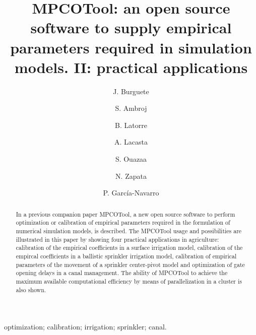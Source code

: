 \documentclass[review,authoryear]{elsarticle}
\begin{document}
\title{MPCOTool: an open source software to supply empirical parameters
required in simulation models. II: practical applications}

\author[eead,bifi]{J. Burguete}

\author[kit]{S. Ambroj}

\author[eead]{B. Latorre}

\author[unizar]{A. Lacasta}

\author[eead]{S. Ouazaa}

\author[eead]{N. Zapata}

\author[unizar]{P. García-Navarro}


\address[eead]{Soil and Water, EEAD / CSIC.
P.O. Box 13034, 50080~Zaragoza, Spain.}
\address[bifi]{BIFI: Instituto de Biocomputación y Física de Sistemas Complejos,
Universidad de Zaragoza.
Mariano Esquillor, Edificio I+D, 50009~Zaragoza, Spain.}
\address[kit]{Steinbuch Centre for Computing (SCC),
Karlsruhe Institute of Technology (KIT).
KIT-Campus Nord, Hermann von Helmholtzplatz 1, 76344 Eggenstein - Leopoldshafen,
Germany.}
\address[unizar]{Fluid Mechanics, LIFTEC, CSIC-Universidad de Zaragoza.
María de Luna 3, 50018~Zaragoza, Spain.}

\begin{keyword}
optimization; calibration; irrigation; sprinkler; canal.
\end{keyword}

\begin{abstract}
In a previous companion paper MPCOTool, a new open source software to perform
optimization or calibration of empirical parameters required in the
formulation of numerical simulation models, is described.
The MPCOTool usage and possibilities are illustrated in this paper by showing
four practical
applications in agriculture: calibration of the empirical coefficients in a
surface irrigation model, calibration of the empircal coefficients in a ballistic sprinkler irrigation model,
calibration of empirical parameters of the movement of a sprinkler center-pivot model and optimization of gate opening delays in a canal management.
The ability of MPCOTool to achieve the maximum available computational efficiency by means of parallelization in a cluster is also shown.
\end{abstract}
\end{document}
